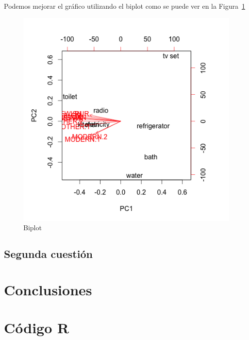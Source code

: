 \documentclass[12pt,a4paper,twoside,openright,titlepage,final]{article}
\begin{document}
Podemos mejorar el gráfico utilizando el biplot como se puede ver en la Figura~\ref{fig:biplot}\\

\begin{figure}[tbph!]
\centering
\includegraphics[width=0.5\linewidth]{imagenes/biplot}
\caption{Biplot}
\label{fig:biplot}
\end{figure}

\subsection{Segunda cuestión}



\section{Conclusiones}

\section{Código R}
\end{document}
